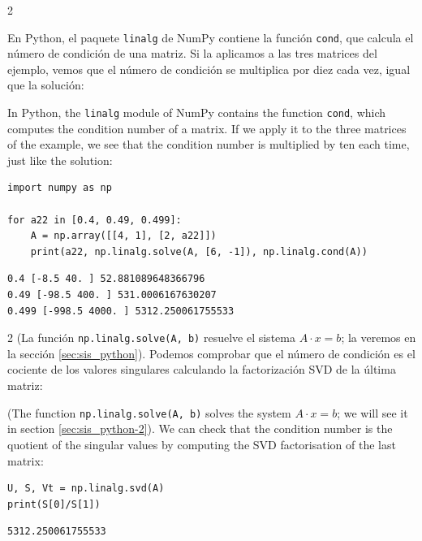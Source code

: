 \begin{paracol}{2}
\switchcolumn

En Python, el paquete \texttt{linalg} de NumPy contiene la función \texttt{cond}, que calcula el número de condición de una matriz. Si la aplicamos a las tres matrices del ejemplo, vemos que el número de condición se multiplica por diez cada vez, igual que la solución:

\switchcolumn
In Python, the \texttt{linalg} module of NumPy contains the function \texttt{cond}, which computes the condition number of a matrix. If we apply it to the three matrices of the example, we see that the condition number is multiplied by ten each time, just like the solution:

\end{paracol}

\begin{verbatim}
import numpy as np

for a22 in [0.4, 0.49, 0.499]:
    A = np.array([[4, 1], [2, a22]])
    print(a22, np.linalg.solve(A, [6, -1]), np.linalg.cond(A))
\end{verbatim}
\begin{verbatim}
0.4 [-8.5 40. ] 52.881089648366796
0.49 [-98.5 400. ] 531.0006167630207
0.499 [-998.5 4000. ] 5312.250061755533
\end{verbatim}

\begin{paracol}{2}
(La función \texttt{np.linalg.solve(A, b)} resuelve el sistema $A\cdot x=b$; la veremos en la sección \ref{sec:sis_python}). Podemos comprobar que el número de condición es el cociente de los valores singulares calculando la factorización SVD de la última matriz:

\switchcolumn
(The function \texttt{np.linalg.solve(A, b)} solves the system $A\cdot x=b$; we will see it in section \ref{sec:sis_python-2}). We can check that the condition number is the quotient of the singular values by computing the SVD factorisation of the last matrix:
\end{paracol}

\begin{verbatim}
U, S, Vt = np.linalg.svd(A)
print(S[0]/S[1])
\end{verbatim}
\begin{verbatim}
5312.250061755533
\end{verbatim}

